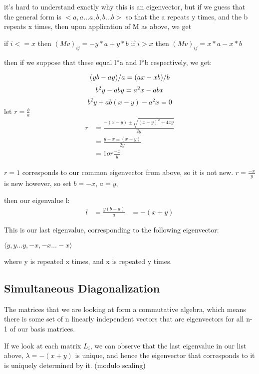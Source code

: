 \documentclass{report}
\begin{document}
it's hard to understand exactly why this is an eigenvector, but if we guess
that the general form is $<a, a\ldots a, b, b\ldots b>$ so that the a repeats y
times, and the b repeats x times, then upon application of M as above, we get

if $i <= x$
then ${(Mv)}_{ij} = -y*a + y*b$
if $i > x$
then ${(Mv)}_{ij} = x*a - x*b$

then if we suppose that these equal l*a and l*b respectively, we get:

\begin{equation*}
	(yb - ay)/a = (ax - xb)/b\\
\end{equation*}
\begin{equation*}
	b^2y - aby = a^2x - abx\\
\end{equation*}
\begin{equation*}
	b^2y + ab(x - y) - a^2x = 0
\end{equation*}
let $r = \frac{b}{a}$
\begin{align*}
	r &= \frac{-(x-y) \pm \sqrt{{(x-y)}^2 + 4xy}}{2y}\\
	  &= \frac{y - x \pm (x + y)}{2y}\\
	  &= 1 or \frac{-x}{y}
\end{align*}

$r = 1$ corresponds to our common eigenvector from above, so it is not new.
$r = \frac{-x}{y}$ is new however, so set $b = -x$, $a = y$,

then our eigenvalue l:
\begin{align*}
	l &= \frac{y(b - a)}{a}
	  &= -(x + y)
\end{align*}

This is our last eigenvalue, corresponding to the following eigenvector:

$\langle y, y\ldots y, -x, -x\ldots -x\rangle$

where y is repeated x times, and x is repeated y times.


\subsection{Simultaneous Diagonalization}

The matrices that we are looking at form a commutative algebra, which means
there is some set of n linearly independent vectors that are eigenvectors for
all n-1 of our basis matrices.

If we look at each matrix $L_i$, we can observe that the last eigenvalue in our
list above, $\lambda = -(x + y)$ is unique, and hence the eigenvector that corresponds
to it is uniquely determined by it. (modulo scaling)
\end{document}
